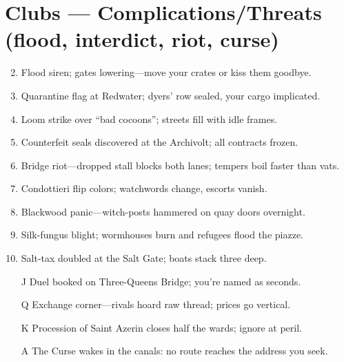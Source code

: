 \section*{Clubs --- Complications/Threats (flood, interdict, riot, curse)}
\label{sec:silkstrand-complications}
\begin{enumerate}
\setcounter{enumi}{1}
\item Flood siren; gates lowering---move your crates or kiss them goodbye.
\item Quarantine flag at Redwater; dyers' row sealed, your cargo implicated.
\item Loom strike over ``bad cocoons''; streets fill with idle frames.
\item Counterfeit seals discovered at the Archivolt; all contracts frozen.
\item Bridge riot---dropped stall blocks both lanes; tempers boil faster than vats.
\item Condottieri flip colors; watchwords change, escorts vanish.
\item Blackwood panic---witch-posts hammered on quay doors overnight.
\item Silk-fungus blight; wormhouses burn and refugees flood the piazze.
\item Salt-tax doubled at the Salt Gate; boats stack three deep.
\item[J] Duel booked on Three-Queens Bridge; you're named as seconds.
\item[Q] Exchange corner---rivals hoard raw thread; prices go vertical.
\item[K] Procession of Saint Azerin closes half the wards; ignore at peril.
\item[A] The Curse wakes in the canals: no route reaches the address you seek.
\end{enumerate}


